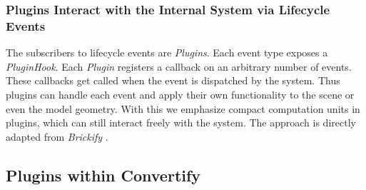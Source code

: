 \documentclass[../ClassicThesis.tex]{subfiles}
\begin{document}


\subsubsection{Plugins Interact with the Internal System via Lifecycle Events}

The subscribers to lifecycle events are \emph{Plugins}. Each event type exposes
a \emph{PluginHook}. Each \emph{Plugin} registers a callback on an arbitrary
number of events. These callbacks get called when the event is dispatched by the
system. Thus plugins can handle each event and apply their own functionality to
the scene or even the model geometry. With this we emphasize compact computation
units in plugins, which can still interact freely with the system. The approach
is directly adapted from \emph{Brickify} .


\subsection{Plugins within Convertify}
\end{document}
